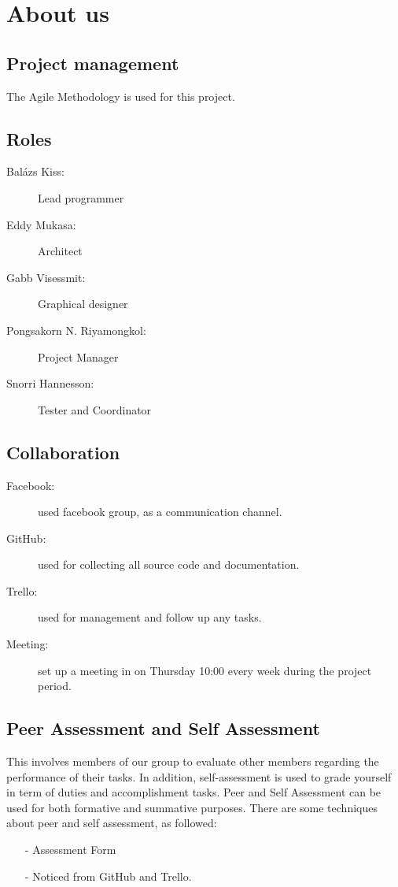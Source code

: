 \documentclass[11pt]{article}
\begin{document}

\section{About us}
\subsection{Project management}
The Agile Methodology is used for this project. 

\subsection{Roles}
\begin{description}
\item[Balázs Kiss:] Lead programmer
\item[Eddy Mukasa:] Architect
\item[Gabb Visessmit:] Graphical designer
\item[Pongsakorn N. Riyamongkol:] Project Manager
\item[Snorri Hannesson:] Tester and Coordinator
\end{description}

\subsection{Collaboration}
\begin{description}
\item[Facebook:] used facebook group, as a communication channel.
\item[GitHub:] used for collecting all source code and documentation.
\item[Trello:] used for management and follow up any tasks.
\item[Meeting:] set up a meeting in on Thursday 10:00 every week during the project period.
\end{description}

\subsection{Peer Assessment and Self Assessment}
This involves members of our group to evaluate other members regarding the performance of
their tasks. In addition, self-assessment is used to grade yourself in term of duties and
accomplishment tasks. Peer and Self Assessment can be used for both formative and summative
purposes. There are some techniques about peer and self assessment, as followed:
\begin{itemize}
\item[-] Assessment Form
\item[-] Noticed from GitHub and Trello.  
\end{itemize}
\end{document}
